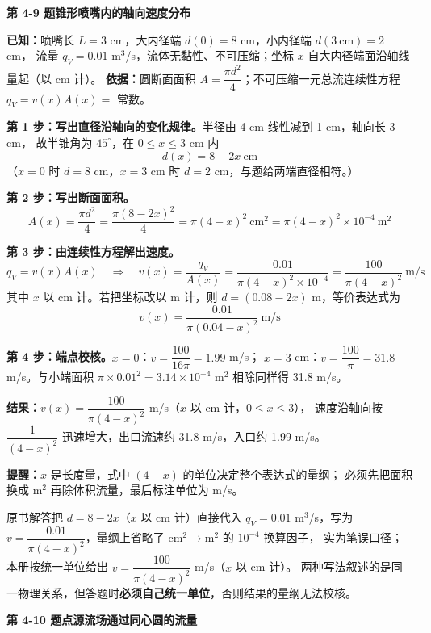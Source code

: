 \noindent\textbf{第 4-9 题\quad 锥形喷嘴内的轴向速度分布}

\begin{jie}
\textbf{已知：}喷嘴长 $L=3$ cm，大内径端 $d(0)=8$ cm，小内径端 $d(3\ \mathrm{cm})=2$ cm，
流量 $q_V=0.01$ m$^3$/s，流体无黏性、不可压缩；坐标 $x$ 自大内径端面沿轴线量起（以 cm 计）。
\textbf{依据：}圆断面面积 $A=\dfrac{\pi d^2}{4}$；不可压缩一元总流连续性方程 $q_V=v(x)A(x)=$ 常数。

\textbf{第 1 步：写出直径沿轴向的变化规律。}半径由 4 cm 线性减到 1 cm，轴向长 3 cm，
故半锥角为 $45^\circ$，在 $0\le x\le3$ cm 内
\[ d(x)=8-2x\ \mathrm{cm} \]
（$x=0$ 时 $d=8$ cm，$x=3$ cm 时 $d=2$ cm，与题给两端直径相符。）

\textbf{第 2 步：写出断面面积。}
\[ A(x)=\frac{\pi d^2}{4}=\frac{\pi(8-2x)^2}{4}=\pi(4-x)^2\ \mathrm{cm^2}=\pi(4-x)^2\times10^{-4}\ \mathrm{m^2} \]

\textbf{第 3 步：由连续性方程解出速度。}
\[ q_V=v(x)A(x)\quad\Longrightarrow\quad
   v(x)=\frac{q_V}{A(x)}=\frac{0.01}{\pi(4-x)^2\times10^{-4}}=\frac{100}{\pi(4-x)^2}\ \mathrm{m/s} \]
其中 $x$ 以 cm 计。若把坐标改以 m 计，则 $d=(0.08-2x)$ m，等价表达式为
\[ v(x)=\frac{0.01}{\pi(0.04-x)^2}\ \mathrm{m/s} \]

\textbf{第 4 步：端点校核。}$x=0$：$v=\dfrac{100}{16\pi}=1.99$ m/s；
$x=3$ cm：$v=\dfrac{100}{\pi}=31.8$ m/s。与小端面积 $\pi\times0.01^2=3.14\times10^{-4}$ m$^2$ 相除同样得 31.8 m/s。

\textbf{结果：}$v(x)=\dfrac{100}{\pi(4-x)^2}$ m/s（$x$ 以 cm 计，$0\le x\le3$），
速度沿轴向按 $\dfrac{1}{(4-x)^2}$ 迅速增大，出口流速约 31.8 m/s，入口约 1.99 m/s。

\textbf{提醒：}$x$ 是长度量，式中 $(4-x)$ 的单位决定整个表达式的量纲；
必须先把面积换成 m$^2$ 再除体积流量，最后标注单位为 m/s。
\end{jie}

\begin{tishi}
原书解答把 $d=8-2x$（$x$ 以 cm 计）直接代入 $q_V=0.01$ m$^3$/s，写为
$v=\dfrac{0.01}{\pi(4-x)^2}$，量纲上省略了 $\mathrm{cm^2}\to\mathrm{m^2}$ 的 $10^{-4}$ 换算因子，
实为笔误口径；本册按统一单位给出 $v=\dfrac{100}{\pi(4-x)^2}$ m/s（$x$ 以 cm 计）。
两种写法叙述的是同一物理关系，但答题时\textbf{必须自己统一单位}，否则结果的量纲无法校核。
\end{tishi}

\noindent\textbf{第 4-10 题\quad 点源流场通过同心圆的流量}

